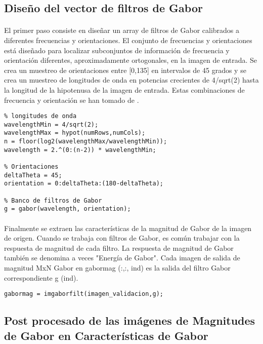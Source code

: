 \documentclass[es,gi]{ifirak}\usepackage[]{graphicx}\usepackage[]{color}
\begin{document}
\subsection{Diseño del vector de filtros de Gabor}

\paragraph{}El primer paso consiste en diseñar un array de filtros de Gabor calibrados a diferentes frecuencias y orientaciones. El conjunto de frecuencias y orientaciones está diseñado para localizar subconjuntos de información de frecuencia y orientación diferentes, aproximadamente ortogonales, en la imagen de entrada. Se crea un muestreo de orientaciones entre [0,135] en intervalos de 45 grados y se crea un muestreo de longitudes de onda en potencias crecientes de 4/sqrt(2) hasta la longitud de la hipotenusa de la imagen de entrada. Estas combinaciones de frecuencia y orientación se han tomado de \cite{key-3}. 
\begin{lstlisting}
% longitudes de onda
wavelengthMin = 4/sqrt(2);
wavelengthMax = hypot(numRows,numCols);
n = floor(log2(wavelengthMax/wavelengthMin));
wavelength = 2.^(0:(n-2)) * wavelengthMin;

% Orientaciones
deltaTheta = 45;
orientation = 0:deltaTheta:(180-deltaTheta);

% Banco de filtros de Gabor
g = gabor(wavelength, orientation);

\end{lstlisting}
\paragraph{}Finalmente se extraen las características de la magnitud de Gabor de la imagen de origen. Cuando se trabaja con filtros de Gabor, es común trabajar con la respuesta de magnitud de cada filtro. La respuesta de magnitud de Gabor también se denomina a veces "Energía de Gabor". Cada imagen de salida de magnitud MxN Gabor en gabormag (:,:, ind) es la salida del filtro Gabor correspondiente g (ind).
\begin{lstlisting}
gabormag = imgaborfilt(imagen_validacion,g);
\end{lstlisting}

\subsection{Post procesado de las imágenes de Magnitudes de Gabor en Características de Gabor}
\end{document}
